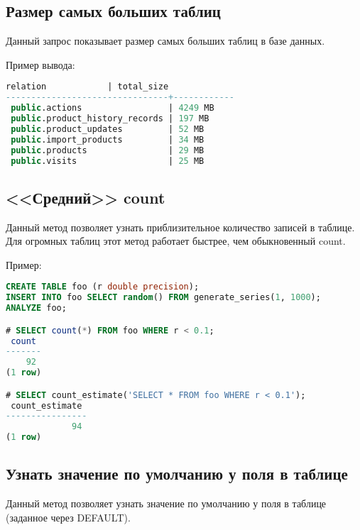 \subsection{Размер самых больших таблиц}
Данный запрос показывает размер самых больших таблиц в базе данных.



Пример вывода:
\begin{lstlisting}[language=SQL,label=lst:snippets4,caption=Размер самых больших таблиц. Пример вывода]
            relation            | total_size
--------------------------------+------------
 public.actions                 | 4249 MB
 public.product_history_records | 197 MB
 public.product_updates         | 52 MB
 public.import_products         | 34 MB
 public.products                | 29 MB
 public.visits                  | 25 MB
\end{lstlisting}

\subsection{<<Средний>> count}
Данный метод позволяет узнать приблизительное количество записей в таблице. Для огромных таблиц этот метод работает быстрее, чем обыкновенный count.



Пример:

\begin{lstlisting}[language=SQL,label=lst:snippets51,caption=<<Средний>> count. Пример]
CREATE TABLE foo (r double precision);
INSERT INTO foo SELECT random() FROM generate_series(1, 1000);
ANALYZE foo;

# SELECT count(*) FROM foo WHERE r < 0.1;
 count
-------
    92
(1 row)

# SELECT count_estimate('SELECT * FROM foo WHERE r < 0.1');
 count_estimate
----------------
             94
(1 row)
\end{lstlisting}

\subsection{Узнать значение по умолчанию у поля в таблице}
Данный метод позволяет узнать значение по умолчанию у поля в таблице (заданное через DEFAULT).

